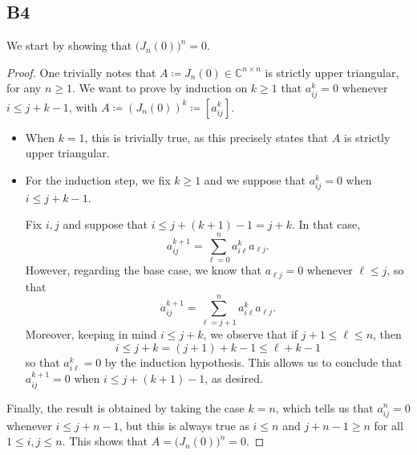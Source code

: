 \documentclass[11pt]{article}
\newcommand{\complex}{\mathbb{C}} %
\begin{document}
\subsection*{B4}
We start by showing that \(\big(J_n(0)\big)^n=0\).
\begin{proof}
One trivially notes that \(A \coloneqq J_n(0) \in \complex^{n \times n}\) is strictly upper triangular, for any \(n \geqslant 1\).
We want to prove by induction on \(k \geqslant 1\) that \(a_{ij}^k = 0\) whenever \(i \leqslant j + k - 1\), with \(A \coloneqq (J_n(0))^k \coloneqq [a_{ij}^k]\).

\begin{itemize}
\item When \(k = 1\), this is trivially true, as this precisely states that \(A\) is strictly upper triangular.

\item For the induction step, we fix \(k \geqslant 1\) and we suppose that \(a_{ij}^k = 0\) when \(i \leqslant j + k - 1\).

Fix \(i, j\) and suppose that \(i \leqslant j + (k + 1) - 1 = j + k \).
In that case,
\[
a_{ij}^{k+1} = \sum_{\ell = 0}^n a_{i \ell}^k a_{\ell j}.
\]
However, regarding the base case, we know that \(a_{\ell j} = 0\) whenever \(\ell \leqslant j\), so that
\[
a_{ij}^{k+1} = \sum_{\ell = j + 1}^n a_{i \ell}^k a_{\ell j}.
\]
Moreover, keeping in mind \(i \leqslant j + k \), we observe that if \(j+1 \leqslant \ell \leqslant n\), then
\[
i \leqslant j + k = (j + 1) + k - 1 \leqslant \ell + k - 1
\]
so that \(a_{i \ell}^k = 0\) by the induction hypothesis.
This allows us to conclude that \(a_{ij}^{k+1} = 0\) when \(i \leqslant j + (k+1) -1 \), as desired.
\end{itemize}
Finally, the result is obtained by taking the case \(k = n\), which tells us that \(a_{ij}^n = 0\) whenever \(i \leqslant j + n - 1\), but this is always true as \(i \leqslant n\) and \(j + n - 1 \geqslant n\) for all \(1 \leqslant i, j \leqslant n\).
This shows that \(A = \big(J_n(0)\big)^n = 0\).
\end{proof}
\end{document}
